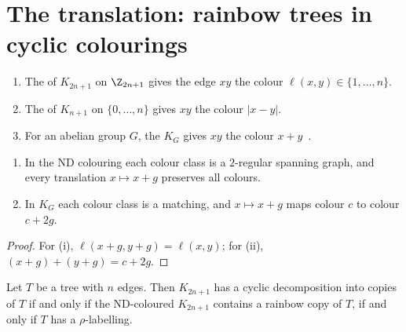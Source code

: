 \section{The translation: rainbow trees in cyclic colourings}\label{sec:translation}

\begin{definition}\label{def:colourings}
\leavevmode
\begin{enumerate}
\item The  of $K_{2n+1}$ on $\Z_{2n+1}$ gives the edge $xy$ the colour $\ell(x,y)\in\{1,\dots,n\}$.
\item The  of $K_{n+1}$ on $\{0,\dots,n\}$ gives $xy$ the colour $|x-y|$.
\item For an abelian group $G$, the  $K_G$ gives $xy$ the colour $x+y$~\cite[Definition~1.2]{mp25b}.
\end{enumerate}
\end{definition}

\begin{lemma}\label{lem:colourings}
\leavevmode
\begin{enumerate}
\item In the ND colouring each colour class is a $2$-regular spanning graph, and every translation $x\mapsto x+g$ preserves all colours.
\item In $K_G$ each colour class is a matching, and $x\mapsto x+g$ maps colour $c$ to colour $c+2g$.
\end{enumerate}
\end{lemma}

\begin{proof}
For (i), $\ell(x+g,y+g)=\ell(x,y)$; for (ii), $(x+g)+(y+g)=c+2g$.
\end{proof}

\begin{proposition}\label{prop:kotzig}
Let $T$ be a tree with $n$ edges. Then $K_{2n+1}$ has a cyclic decomposition into copies of $T$ if and only if the ND-coloured $K_{2n+1}$ contains a rainbow copy of $T$, if and only if $T$ has a $\rho$-labelling.
\end{proposition}

